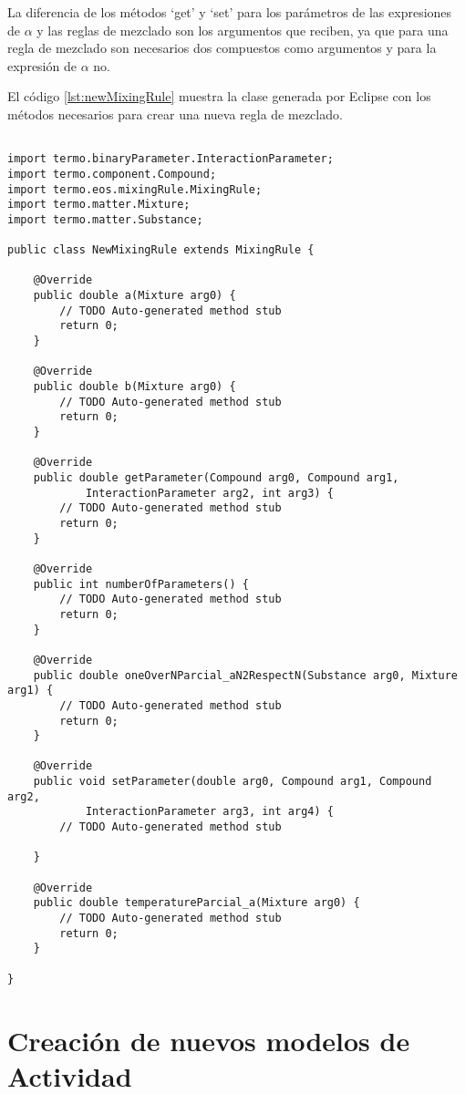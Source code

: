 	La diferencia de los métodos `get' y `set' para los parámetros de las expresiones de $\alpha$ y las reglas de mezclado son los argumentos que reciben, ya que para una regla de mezclado son necesarios dos compuestos como argumentos y para la expresión de $\alpha$ no.

	El código \ref{lst:newMixingRule} muestra la clase generada por Eclipse con los métodos necesarios para crear una nueva regla de mezclado.

	\begin{lstlisting}[caption={Esqueleto para la creación de una nueva regla de mezclado},label={lst:newMixingRule}]

import termo.binaryParameter.InteractionParameter;
import termo.component.Compound;
import termo.eos.mixingRule.MixingRule;
import termo.matter.Mixture;
import termo.matter.Substance;

public class NewMixingRule extends MixingRule {

	@Override
	public double a(Mixture arg0) {
		// TODO Auto-generated method stub
		return 0;
	}

	@Override
	public double b(Mixture arg0) {
		// TODO Auto-generated method stub
		return 0;
	}

	@Override
	public double getParameter(Compound arg0, Compound arg1,
			InteractionParameter arg2, int arg3) {
		// TODO Auto-generated method stub
		return 0;
	}

	@Override
	public int numberOfParameters() {
		// TODO Auto-generated method stub
		return 0;
	}

	@Override
	public double oneOverNParcial_aN2RespectN(Substance arg0, Mixture arg1) {
		// TODO Auto-generated method stub
		return 0;
	}

	@Override
	public void setParameter(double arg0, Compound arg1, Compound arg2,
			InteractionParameter arg3, int arg4) {
		// TODO Auto-generated method stub

	}

	@Override
	public double temperatureParcial_a(Mixture arg0) {
		// TODO Auto-generated method stub
		return 0;
	}

}

	\end{lstlisting}

\section{Creación de nuevos modelos de Actividad}\label{sec:newActivityModels}

